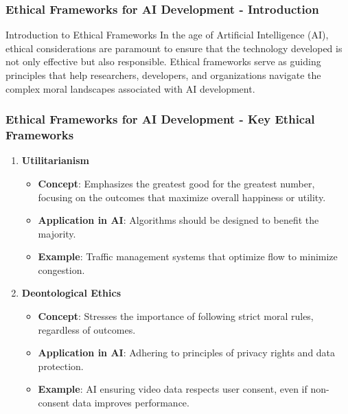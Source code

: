\documentclass{beamer}
\begin{document}
\begin{frame}[fragile]
    \frametitle{Ethical Frameworks for AI Development - Introduction}
    \begin{block}{Introduction to Ethical Frameworks}
        In the age of Artificial Intelligence (AI), ethical considerations are paramount to ensure that the technology developed is not only effective but also responsible. 
        Ethical frameworks serve as guiding principles that help researchers, developers, and organizations navigate the complex moral landscapes associated with AI development.
    \end{block}
\end{frame}

\begin{frame}[fragile]
    \frametitle{Ethical Frameworks for AI Development - Key Ethical Frameworks}
    \begin{enumerate}
        \item \textbf{Utilitarianism}
            \begin{itemize}
                \item \textbf{Concept}: Emphasizes the greatest good for the greatest number, focusing on the outcomes that maximize overall happiness or utility.
                \item \textbf{Application in AI}: Algorithms should be designed to benefit the majority.
                \item \textbf{Example}: Traffic management systems that optimize flow to minimize congestion.
            \end{itemize}
        
        \item \textbf{Deontological Ethics}
            \begin{itemize}
                \item \textbf{Concept}: Stresses the importance of following strict moral rules, regardless of outcomes.
                \item \textbf{Application in AI}: Adhering to principles of privacy rights and data protection.
                \item \textbf{Example}: AI ensuring video data respects user consent, even if non-consent data improves performance.
            \end{itemize}


\end{enumerate}
\end{frame}
\end{document}

